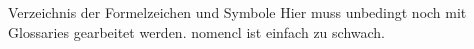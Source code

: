 \tableofcontents%
\newpage%
%
%
\printnoidxglossaries%
\newpage%
%
%
Verzeichnis der Formelzeichen und Symbole%
Hier muss unbedingt noch mit Glossaries gearbeitet werden. nomencl ist einfach zu schwach.%
\newpage%
%
%
\listoffigures%
\newpage%
%
%
\listoftables%
\newpage%